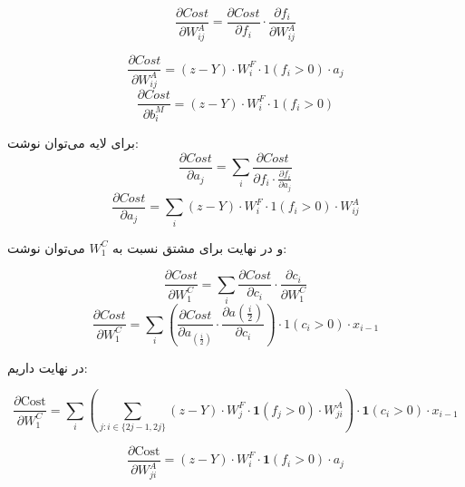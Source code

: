 \begin{qsolve}
	$$ \frac{\partial Cost}{\partial W_{ij}^A}=\frac{\partial Cost}{\partial f_i} \cdot \frac{\partial f_i}{\partial W_{ij}^A}$$
	
	$$ \frac{\partial Cost}{\partial W_{ij}^A}=(z-Y)\cdot W_i^F\cdot 1 (f_i > 0)\cdot a_j $$
	$$ \frac{\partial Cost}{\partial b_i^M}=(z-Y)\cdot W_i^F\cdot 1 (f_i > 0) $$
	
	
	
	برای لایه  می‌توان نوشت:
	$$ \frac{\partial Cost}{\partial a_j} = \sum_{i} \frac{\partial Cost}{\partial f_i \cdot \frac{\partial f_i}{\partial a_j}}$$
	$$ \frac{\partial Cost}{\partial a_j}=\sum_{i} (z-Y)\cdot W_i^F\cdot 1(f_i>0)\cdot W_{ij}^A$$
	
	
	و در نهایت برای مشتق نسبت به $W_1^C$ می‌توان نوشت:
	
	$$ \frac{\partial Cost}{\partial W_1^C}=\sum_{i} \frac{\partial Cost}{\partial c_i}\cdot \frac{\partial c_i}{\partial W_1^C}$$
	$$ \frac{\partial Cost}{\partial W_1^C}=\sum_{i} (\frac{\partial Cost}{\partial a_(\frac{i}{2})}\cdot \frac{\partial a(\frac{i}{2})}{\partial c_i})\cdot 1 (c_i>0) \cdot x_{i-1} $$
	
	در نهایت داریم:
	
	$$
		\frac{\partial \text{Cost}}{\partial W_1^C} = \sum_i \left( \sum_{j: i \in \{2j-1, 2j\}} (z - Y) \cdot W_j^F \cdot \mathbf{1}(f_j > 0) \cdot W_{ji}^A \right) \cdot \mathbf{1}(c_i > 0) \cdot x_{i-1}
	$$
	
	$$
		\frac{\partial \text{Cost}}{\partial W_{ji}^A} = (z - Y) \cdot W_i^F \cdot \mathbf{1}(f_i > 0) \cdot a_j
	$$
	
\end{qsolve}









